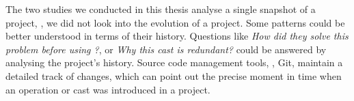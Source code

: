 The two studies we conducted in this thesis analyse a single snapshot of a project,
\ie{}, we did not look into the evolution of a project.
Some patterns could be better understood in terms of their history.
Questions like
\emph{How did they solve this problem before using \unsafe{}?},
or \emph{Why this cast is redundant?}
could be answered by analysing the project's history. 
Source code management tools, \eg{}, Git,
maintain a detailed track of changes,
which can point out the precise moment in time when an \unsafe{} operation or cast was introduced in a project.


